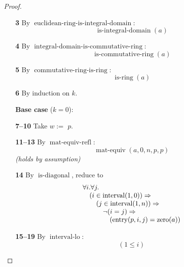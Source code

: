 \documentclass[11pt]{article}
\theoremstyle{plain}
\begin{document}
\begin{proof}
\begin{itemize}[leftmargin=2.8em, itemsep=4pt, parsep=1pt]
  \item[\textbf{3}] By $\operatorname{euclidean\text{-}ring\text{-}is\text{-}integral\text{-}domain}$:
\begin{equation*}
\operatorname{is\text{-}integral\text{-}domain}(a)
\end{equation*}

  \item[\textbf{4}] By $\operatorname{integral\text{-}domain\text{-}is\text{-}commutative\text{-}ring}$:
\begin{equation*}
\operatorname{is\text{-}commutative\text{-}ring}(a)
\end{equation*}

  \item[\textbf{5}] By $\operatorname{commutative\text{-}ring\text{-}is\text{-}ring}$:
\begin{equation*}
\operatorname{is\text{-}ring}(a)
\end{equation*}

  \item[\textbf{6}] By induction on $k$.
  \item[]\textbf{Base case} ($k = 0$):
  \item[\textbf{7--10}] Take $w :=$ $p$.
  \item[\textbf{11--13}] By $\operatorname{mat\text{-}equiv\text{-}refl}$:
\begin{equation*}
\operatorname{mat\text{-}equiv}(a, 0, n, p, p)
\end{equation*}
  \emph{(holds by assumption)}
  \item[\textbf{14}] By $\operatorname{is\text{-}diagonal}$, reduce to
\begin{equation*}
\begin{array}{@{}l@{}} \forall i. \forall j. \\ \quad (i \in \operatorname{interval}(1, 0)) \Rightarrow  \\ \quad \quad (j \in \operatorname{interval}(1, n)) \Rightarrow  \\ \quad \quad \quad \neg (i = j) \Rightarrow  \\ \quad \quad \quad \quad (\operatorname{entry}(p, i, j) = \operatorname{zero}(a)) \end{array}
\end{equation*}

  \item[\textbf{15--19}] By $\operatorname{interval\text{-}lo}$:
\begin{equation*}
(1 \leq i)
\end{equation*}


\end{itemize}
\end{proof}
\end{document}
